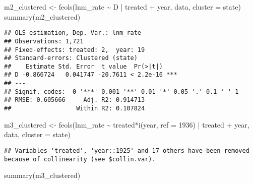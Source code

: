 \documentclass[
]{article}
\newenvironment{Shaded}{\begin{snugshade}}{\end{snugshade}}
\newcommand{\AttributeTok}[1]{\textcolor[rgb]{0.77,0.63,0.00}{#1}}
\newcommand{\DecValTok}[1]{\textcolor[rgb]{0.00,0.00,0.81}{#1}}
\newcommand{\FunctionTok}[1]{\textcolor[rgb]{0.00,0.00,0.00}{#1}}
\newcommand{\NormalTok}[1]{#1}
\newcommand{\OtherTok}[1]{\textcolor[rgb]{0.56,0.35,0.01}{#1}}
\newcommand{\SpecialCharTok}[1]{\textcolor[rgb]{0.00,0.00,0.00}{#1}}
\newcommand{\StringTok}[1]{\textcolor[rgb]{0.31,0.60,0.02}{#1}}
\begin{document}
\begin{Shaded}
\begin{Highlighting}[]
\NormalTok{m2\_clustered }\OtherTok{\textless{}{-}} \FunctionTok{feols}\NormalTok{(lnm\_rate }\SpecialCharTok{\textasciitilde{}}\NormalTok{ D }\SpecialCharTok{|}\NormalTok{ treated }\SpecialCharTok{+}\NormalTok{ year, data,}
            \AttributeTok{cluster =} \StringTok{\textquotesingle{}state\textquotesingle{}}\NormalTok{)}
\FunctionTok{summary}\NormalTok{(m2\_clustered)}
\end{Highlighting}
\end{Shaded}

\begin{verbatim}
## OLS estimation, Dep. Var.: lnm_rate
## Observations: 1,721 
## Fixed-effects: treated: 2,  year: 19
## Standard-errors: Clustered (state) 
##    Estimate Std. Error  t value  Pr(>|t|)    
## D -0.866724   0.041747 -20.7611 < 2.2e-16 ***
## ---
## Signif. codes:  0 '***' 0.001 '**' 0.01 '*' 0.05 '.' 0.1 ' ' 1
## RMSE: 0.605666     Adj. R2: 0.914713
##                  Within R2: 0.107824
\end{verbatim}

\begin{Shaded}
\begin{Highlighting}[]
\NormalTok{m3\_clustered }\OtherTok{\textless{}{-}} \FunctionTok{feols}\NormalTok{(lnm\_rate }\SpecialCharTok{\textasciitilde{}}\NormalTok{ treated}\SpecialCharTok{*}\FunctionTok{i}\NormalTok{(year, }\AttributeTok{ref =} \DecValTok{1936}\NormalTok{) }\SpecialCharTok{|}\NormalTok{ treated }\SpecialCharTok{+}\NormalTok{ year, data,}
 \AttributeTok{cluster =} \StringTok{\textquotesingle{}state\textquotesingle{}}\NormalTok{)}
\end{Highlighting}
\end{Shaded}

\begin{verbatim}
## Variables 'treated', 'year::1925' and 17 others have been removed because of collinearity (see $collin.var).
\end{verbatim}

\begin{Shaded}
\begin{Highlighting}[]
\FunctionTok{summary}\NormalTok{(m3\_clustered)}
\end{Highlighting}
\end{Shaded}
\end{document}
